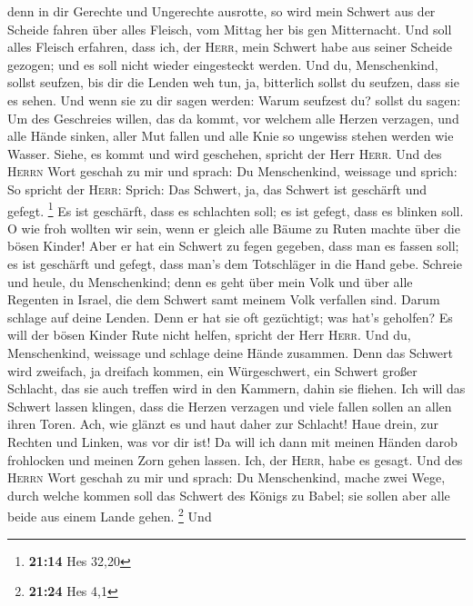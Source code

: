 denn in dir Gerechte und Ungerechte ausrotte, so wird mein Schwert aus
der Scheide fahren über alles Fleisch, vom Mittag her bis gen
Mitternacht.  Und soll alles Fleisch erfahren, dass ich,
der \textsc{Herr}, mein Schwert habe aus seiner Scheide gezogen; und es
soll nicht wieder eingesteckt werden.  Und du,
Menschenkind, sollst seufzen, bis dir die Lenden weh tun, ja, bitterlich
sollst du seufzen, dass sie es sehen.  Und wenn sie zu
dir sagen werden: Warum seufzest du? sollst du sagen: Um des Geschreies
willen, das da kommt, vor welchem alle Herzen verzagen, und alle Hände
sinken, aller Mut fallen und alle Knie so ungewiss stehen werden wie
Wasser. Siehe, es kommt und wird geschehen, spricht der Herr
\textsc{Herr}.  Und des \textsc{Herrn} Wort geschah zu
mir und sprach:  Du Menschenkind, weissage und sprich: So
spricht der \textsc{Herr}: Sprich: Das Schwert, ja, das Schwert ist
geschärft und gefegt. \footnote{\textbf{21:14} Hes 32,20}
 Es ist geschärft, dass es schlachten soll; es ist
gefegt, dass es blinken soll. O wie froh wollten wir sein, wenn er
gleich alle Bäume zu Ruten machte über die bösen Kinder! 
Aber er hat ein Schwert zu fegen gegeben, dass man es fassen soll; es
ist geschärft und gefegt, dass man's dem Totschläger in die Hand gebe.
 Schreie und heule, du Menschenkind; denn es geht über
mein Volk und über alle Regenten in Israel, die dem Schwert samt meinem
Volk verfallen sind. Darum schlage auf deine Lenden. 
Denn er hat sie oft gezüchtigt; was hat's geholfen? Es will der bösen
Kinder Rute nicht helfen, spricht der Herr \textsc{Herr}.
 Und du, Menschenkind, weissage und schlage deine Hände
zusammen. Denn das Schwert wird zweifach, ja dreifach kommen, ein
Würgeschwert, ein Schwert großer Schlacht, das sie auch treffen wird in
den Kammern, dahin sie fliehen.  Ich will das Schwert
lassen klingen, dass die Herzen verzagen und viele fallen sollen an
allen ihren Toren. Ach, wie glänzt es und haut daher zur Schlacht!
 Haue drein, zur Rechten und Linken, was vor dir ist!
 Da will ich dann mit meinen Händen darob frohlocken und
meinen Zorn gehen lassen. Ich, der \textsc{Herr}, habe es gesagt.
 Und des \textsc{Herrn} Wort geschah zu mir und sprach:
 Du Menschenkind, mache zwei Wege, durch welche kommen
soll das Schwert des Königs zu Babel; sie sollen aber alle beide aus
einem Lande gehen. \footnote{\textbf{21:24} Hes 4,1}  Und
